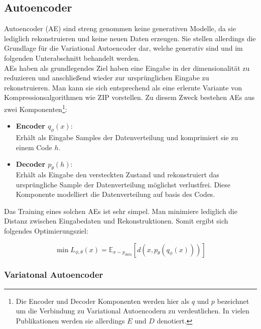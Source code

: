 \subsection{Autoencoder}

Autoencoder (AE) sind streng genommen keine generativen Modelle, da sie lediglich rekonstruieren und keine neuen Daten erzeugen. Sie stellen allerdings die Grundlage für die Variational Autoencoder dar, welche generativ sind und im folgenden Unterabschnitt behandelt werden. \\ 
AEs haben als grundlegendes Ziel haben eine Eingabe in der dimensionalität zu reduzieren und anschließend wieder zur ursprünglichen Eingabe zu rekonstruieren. Man kann sie sich entsprechend als eine erlernte Variante von Kompressionsalgorithmen wie ZIP vorstellen. 
Zu diesem Zweck bestehen AEs aus zwei Komponenten\footnote{
    Die Encoder und Decoder Komponenten werden hier als $q$ und $p$ bezeichnet um die Verbindung zu Variational Autoencodern zu verdeutlichen. In vielen Publikationen werden sie allerdings $E$ und $D$ denotiert.    
}:
\begin{itemize}
    \item \textbf{Encoder $q_\phi(x)$}: \\
    Erhält als Eingabe Samples der Datenverteilung und komprimiert sie zu einem Code $h$.
    \item \textbf{Decoder $p_\theta(h)$}: \\
    Erhält als Eingabe den versteckten Zustand und rekonstruiert das ursprüngliche Sample der Datenverteilung möglichst verlustfrei. Diese Komponente modelliert die Datenverteilung auf basis des Codes.
\end{itemize}

Das Training eines solchen AEs ist sehr simpel. Man minimiere lediglich die Distanz zwischen Eingabedaten und Rekonstruktionen. Somit ergibt sich folgendes Optimierungsziel:

\begin{equation}
    \min L_{\phi, \theta}(x) = \mathbb E _{x \sim p_{data}} 
    \left [ 
        d(x, p_\theta(q_\phi(x)))
    \right ]
\end{equation}

\subsubsection{Variatonal Autoencoder}

